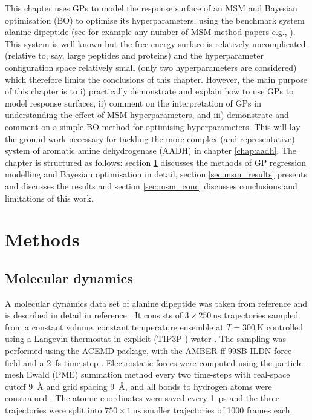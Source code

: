 This chapter uses GPs to model the response surface of an MSM  and Bayesian optimisation (BO) to optimise its hyperparameters, using the benchmark system alanine dipeptide (see for example any number of MSM method papers e.g.,  \cite{wehmeyerTimelaggedAutoencodersDeep2018a,nuskeVariationalApproachMolecular2014,bowmanQuantitativeComparisonAlternative2013}). This system is well known but the free energy surface is relatively uncomplicated (relative to, say, large peptides and proteins) and the hyperparameter configuration space relatively small (only two hyperparameters are considered) which therefore limits the conclusions of this chapter. However, the main purpose of this chapter is to i) practically demonstrate and explain how to use GPs to model response surfaces, ii) comment on the interpretation of GPs in understanding the effect of MSM hyperparameters, and iii) demonstrate and comment on a simple BO method for optimising hyperparameters. This will lay the ground work necessary for tackling the more complex (and representative) system of aromatic amine dehydrogenase (AADH) in chapter \ref{chap:aadh}. The chapter is structured as follows: section \ref{sec:msm_methods} discusses the methods of GP regression modelling and Bayesian optimisation in detail, section \ref{sec:msm_results} presents and discusses the results and section \ref{sec:msm_conc} discusses conclusions and limitations of this work. 

\section{Methods}\label{sec:msm_methods}
\subsection{Molecular dynamics}

A molecular dynamics data set  of alanine dipeptide was taken from reference \cite{wehmeyerTimelaggedAutoencodersDeep2018a} and is described in detail in reference \cite{nuskeMarkovStateModels2017b}.  It consists of $3\times \SI{250}{\nano\second}$ trajectories sampled from a constant volume, constant temperature ensemble at $T=\SI{300}{\kelvin}$ controlled using a Langevin thermostat in explicit (TIP3P \cite{jorgensen1983comparison}) water \cite{nuskeMarkovStateModels2017b}. The sampling was performed using the ACEMD \cite{harveyACEMDAcceleratingBiomolecular2009} package, with the AMBER ff-99SB-ILDN \cite{lindorff-larsenImprovedSidechainTorsion2010} force field and a \SI{2}{\femto\second} time-step \cite{nuskeMarkovStateModels2017b}. Electrostatic forces were computed using the particle-mesh Ewald (PME) \cite{dardenParticleMeshEwald1993} summation method every two time-steps with  real-space cutoff \SI{9}{\angstrom} and grid spacing \SI{9}{\angstrom}, and all bonds to hydrogen atoms were constrained \cite{nuskeMarkovStateModels2017b}. The atomic coordinates were saved every \SI{1}{\pico\second} and the three trajectories were split into $750\times\SI{1}{\nano\second}$ smaller trajectories of \num{1000} frames each. 

